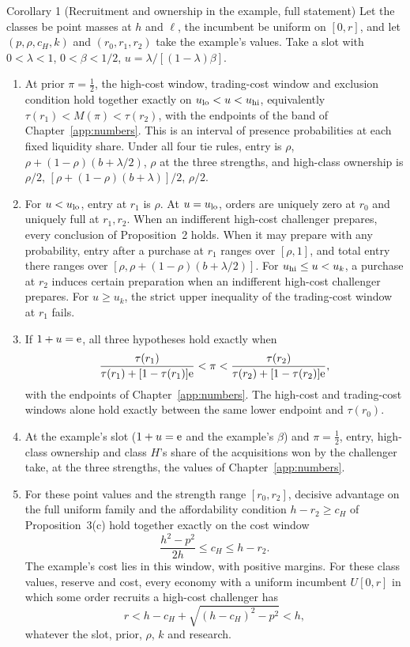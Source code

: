 \begin{paperresult}{Corollary 1 (Recruitment and ownership in the example, full statement)}
Let the classes be point masses at \(h\) and \(\ell\), the incumbent be uniform on \([0,r]\), and let
\((p,\rho,c_H,k)\) and \((r_0,r_1,r_2)\) take the example's values. Take a slot with \(0<\lambda<1\),
\(0<\beta<1/2\), \(u=\lambda/[(1-\lambda)\beta]\).
\begin{enumerate}[label=(\alph*),leftmargin=2em]
\item At prior \(\pi=\tfrac12\), the high-cost window, trading-cost window and exclusion condition hold together
  exactly on \(u_{\rm lo}<u<u_{\rm hi}\), equivalently \(\tau(r_1)<M(\pi)<\tau(r_2)\), with the endpoints of the band
  of Chapter~\ref{app:numbers}. This is an interval of presence probabilities at each fixed liquidity share. Under
  all four tie rules, entry is \(\rho\), \(\rho+(1-\rho)(b+\lambda/2)\), \(\rho\) at the three strengths, and
  high-class ownership is \(\rho/2\), \([\rho+(1-\rho)(b+\lambda)]/2\), \(\rho/2\).
\item For \(u<u_{\rm lo}\), entry at \(r_1\) is \(\rho\). At \(u=u_{\rm lo}\), orders are uniquely zero at \(r_0\)
  and uniquely full at \(r_1,r_2\). When an indifferent high-cost challenger prepares, every conclusion of
  Proposition~2 holds. When it may prepare with any probability, entry after a purchase at \(r_1\) ranges over
  \([\rho,1]\), and total entry there ranges over \([\rho,\rho+(1-\rho)(b+\lambda/2)]\). For
  \(u_{\rm hi}\le u<u_k\), a purchase at \(r_2\) induces certain preparation when an indifferent high-cost
  challenger prepares. For \(u\ge u_k\), the strict upper inequality of the trading-cost window at \(r_1\) fails.
\item If \(1+u=\mathrm{e}\), all three hypotheses hold exactly when
  \[
  \frac{\tau(r_1)}{\tau(r_1)+[1-\tau(r_1)]\mathrm{e}}<\pi<\frac{\tau(r_2)}{\tau(r_2)+[1-\tau(r_2)]\mathrm{e}},
  \]
  with the endpoints of Chapter~\ref{app:numbers}. The high-cost and trading-cost windows alone hold exactly
  between the same lower endpoint and \(\tau(r_0)\).
\item At the example's slot (\(1+u=\mathrm{e}\) and the example's \(\beta\)) and \(\pi=\tfrac12\), entry, high-class
  ownership and class \(H\)'s share of the acquisitions won by the challenger take, at the three strengths, the
  values of Chapter~\ref{app:numbers}.
\item For these point values and the strength range \([r_0,r_2]\), decisive advantage on the full uniform family
  and the affordability condition \(h-r_2\ge c_H\) of Proposition~3(c) hold together exactly on the cost window
  \[
  \frac{h^2-p^2}{2h}\le c_H\le h-r_2 .
  \]
  The example's cost lies in this window, with positive margins. For these class values, reserve and cost, every
  economy with a uniform incumbent \(U[0,r]\) in which some order recruits a high-cost challenger has
  \[
  r<h-c_H+\sqrt{(h-c_H)^2-p^2}<h,
  \]
  whatever the slot, prior, \(\rho\), \(k\) and research.
\end{enumerate}
\end{paperresult}


